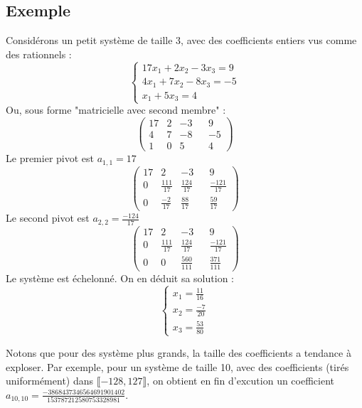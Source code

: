 \documentclass[french]{article}
\begin{document}
\subsection{Exemple}
Considérons un petit système de taille 3, avec des coefficients entiers vus comme des rationnels :
\begin{equation*}
	\begin{cases}
		17 x_1 + 2 x_2 - 3 x_3 = 9\\
		4 x_1 + 7 x_2 - 8 x_3 = -5\\
		x_1 + 5 x_3 = 4
	\end{cases}
\end{equation*}
Ou, sous forme "matricielle avec second membre" :
\begin{equation*}
	\begin{pmatrix}
		17 & 2 & -3 & & 9\\
		4 & 7 & -8 & & -5\\
		1 & 0 & 5 & & 4
	\end{pmatrix}
\end{equation*}
Le premier pivot est $a_{1,1} = 17$
\begin{equation*}
	\begin{pmatrix}
		17 & 2 & -3 & & 9\\
		0 & \frac{111}{17} & \frac{124}{17} & & \frac{-121}{17}\\
		0 & \frac{-2}{17} & \frac{88}{17} & & \frac{59}{17}
	\end{pmatrix}
\end{equation*}
Le second pivot est $a_{2,2} = \frac{-124}{17}$
\begin{equation*}
	\begin{pmatrix}
		17 & 2 & -3 & & 9\\
		0 & \frac{111}{17} & \frac{124}{17} & & \frac{-121}{17}\\
		0 & 0 & \frac{560}{111} & & \frac{371}{111}
	\end{pmatrix}
\end{equation*}
Le système est échelonné. On en déduit sa solution :
\begin{equation*}
	\begin{cases}
		x_1 = \frac{11}{16}\\
		x_2 = \frac{-7}{20}\\
		x_3 = \frac{53}{80}
	\end{cases}
\end{equation*}
\par
Notons que pour des système plus grands, la taille des coefficients a tendance à exploser. Par exemple, pour un système de taille 10, avec des coefficients (tirés uniformément) dans $\llbracket-128,127\rrbracket$, on obtient en fin d'excution un coefficient $a_{10,10} = \frac{-3868437346564691901402}{153787212580753328981}$.
\end{document}
